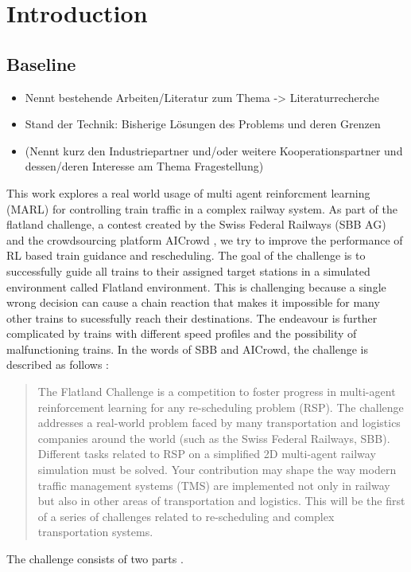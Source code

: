 \chapter{Introduction}\label{chap.einleitung}
\section{Baseline}\label{baseline}
\begin{itemize}
\item Nennt bestehende Arbeiten/Literatur zum Thema -> Literaturrecherche
\item Stand der Technik: Bisherige Lösungen des Problems und deren Grenzen
\item (Nennt kurz den Industriepartner und/oder weitere Kooperationspartner und dessen/deren Interesse am Thema Fragestellung)
\end{itemize}
This work explores a real world usage of multi agent reinforcment learning (MARL) for controlling train traffic in a complex railway system.
As part of the flatland challenge, a contest created by the Swiss Federal Railways (SBB AG) and the crowdsourcing platform AICrowd \cite{aicrowd}, we try to improve the performance of RL based train guidance and rescheduling. The goal of the challenge is to successfully guide all trains to their assigned target stations in a simulated environment called Flatland environment. 
This is challenging because a single wrong decision can cause a chain reaction that makes it impossible for many other trains to sucessfully reach their destinations. The endeavour is further complicated by trains with different speed profiles and the possibility of malfunctioning trains. In the words of SBB and AICrowd, the challenge is described as follows \cite{aicrowd}:
\begin{quote}
	The Flatland Challenge is a competition to foster progress in multi-agent reinforcement learning for any re-scheduling problem (RSP). The challenge addresses a real-world problem faced by many transportation and logistics companies around the world (such as the Swiss Federal Railways, SBB). Different tasks related to RSP on a simplified 2D multi-agent railway simulation must be solved. Your contribution may shape the way modern traffic management systems (TMS) are implemented not only in railway but also in other areas of transportation and logistics. This will be the first of a series of challenges related to re-scheduling and complex transportation systems.
\end{quote}
The challenge consists of two parts \cite{aicrowd}.  
